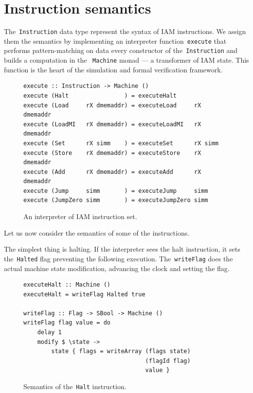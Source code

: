 \section{Instruction semantics}

The~\texttt{Instruction} data type represent the syntax of IAM instructions.
We assign them the semantics by implementing an interpreter
function~\texttt{execute} that performs pattern-matching on data every
constructor of the~\texttt{Instruction} and builds a computation in the
~\texttt{Machine} monad --- a transformer of IAM state. This function
is the heart of the simulation and formal verification framework.

\begin{figure}[H]
\begin{verbatim}
execute :: Instruction -> Machine ()
execute (Halt                ) = executeHalt
execute (Load     rX dmemaddr) = executeLoad     rX dmemaddr
execute (LoadMI   rX dmemaddr) = executeLoadMI   rX dmemaddr
execute (Set      rX simm    ) = executeSet      rX simm
execute (Store    rX dmemaddr) = executeStore    rX dmemaddr
execute (Add      rX dmemaddr) = executeAdd      rX dmemaddr
execute (Jump     simm       ) = executeJump     simm
execute (JumpZero simm       ) = executeJumpZero simm
\end{verbatim}
\caption{An interpreter of IAM instruction set.}
\label{execute}
\end{figure}

Let us now consider the semantics of some of the instructions.

The simplest thing is halting. If the interpreter sees the halt instruction, it
sets the~\texttt{Halted} flag preventing the following execution.
The~\texttt{writeFlag} does the actual machine state modification,
advancing the clock and setting the flag.

\begin{figure}[H]
\begin{verbatim}
executeHalt :: Machine ()
executeHalt = writeFlag Halted true

writeFlag :: Flag -> SBool -> Machine ()
writeFlag flag value = do
    delay 1
    modify $ \state ->
        state { flags = writeArray (flags state)
                                   (flagId flag)
                                   value }
\end{verbatim}
\caption{Semantics of the~\texttt{Halt} instruction.}
\label{haltSemantics}
\end{figure}

